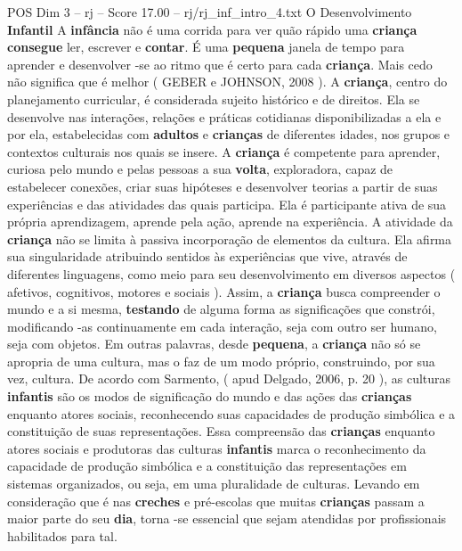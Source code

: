 \begin{textsample}{POS Dim 3 – rj – Score 17.00 – rj/rj\_inf\_intro\_4.txt}  \label{ex:f3_pos_018}
O Desenvolvimento \textbf{Infantil} A \textbf{infância} não é uma corrida para ver quão rápido uma \textbf{criança} \textbf{consegue} ler, escrever e \textbf{contar}.
É uma \textbf{pequena} janela de tempo para aprender e desenvolver -se ao ritmo que é certo para cada \textbf{criança}.
Mais cedo não significa que é melhor ( GEBER e JOHNSON, 2008 ).
A \textbf{criança}, centro do planejamento curricular, é considerada sujeito histórico e de direitos.
Ela se desenvolve nas interações, relações e práticas cotidianas disponibilizadas a ela e por ela, estabelecidas com \textbf{adultos} e \textbf{crianças} de diferentes idades, nos grupos e contextos culturais nos quais se insere.
A \textbf{criança} é competente para aprender, curiosa pelo mundo e pelas pessoas a sua \textbf{volta}, exploradora, capaz de estabelecer conexões, criar suas hipóteses e desenvolver teorias a partir de suas experiências e das atividades das quais participa.
Ela é participante ativa de sua própria aprendizagem, aprende pela ação, aprende na experiência.
A atividade da \textbf{criança} não se limita à passiva incorporação de elementos da cultura.
Ela afirma sua singularidade atribuindo sentidos às experiências que vive, através de diferentes linguagens, como meio para seu desenvolvimento em diversos aspectos ( afetivos, cognitivos, motores e sociais ).
Assim, a \textbf{criança} busca compreender o mundo e a si mesma, \textbf{testando} de alguma forma as significações que constrói, modificando -as continuamente em cada interação, seja com outro ser humano, seja com objetos.
Em outras palavras, desde \textbf{pequena}, a \textbf{criança} não só se apropria de uma cultura, mas o faz de um modo próprio, construindo, por sua vez, cultura.
De acordo com Sarmento, ( apud Delgado, 2006, p. 20 ), as culturas \textbf{infantis} são os modos de significação do mundo e das ações das \textbf{crianças} enquanto atores sociais, reconhecendo suas capacidades de produção simbólica e a constituição de suas representações.
Essa compreensão das \textbf{crianças} enquanto atores sociais e produtoras das culturas \textbf{infantis} marca o reconhecimento da capacidade de produção simbólica e a constituição das representações em sistemas organizados, ou seja, em uma pluralidade de culturas.
Levando em consideração que é nas \textbf{creches} e pré-escolas que muitas \textbf{crianças} passam a maior parte do seu \textbf{dia}, torna -se essencial que sejam atendidas por profissionais habilitados para tal.

\end{textsample}
